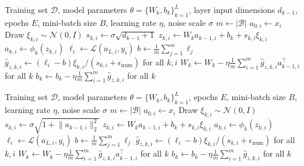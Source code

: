 \begin{algorithm}[htbp]
\caption{Fan-in scaled node perturbation}
\label{alg:fan_in_np_training}
\begin{algorithmic}[1]\algorithmicrowspacing
\Require Training set \(\mathcal{D}\), model parameters \(\theta=\{W_k,b_k\}_{k=1}^{L}\), layer input dimensions \(d_{k-1}\), epochs \(E\), mini-batch size \(B\), learning rate \(\eta\), noise scale \(\sigma\)
        \State \(m \gets |\mathcal{B}|\)
            \State \(a_{0,i}\gets x_i\)
                \State Draw \(\xi_{k,i}\sim\mathcal{N}(0,I)\)
                \State \(s_{k,i}\gets \sigma\sqrt{d_{k-1}+1}\) 
                \State \(z_{k,i}\gets W_k a_{k-1,i}+b_k+s_{k,i}\xi_{k,i}\)
                \State \(a_{k,i}\gets \phi_k(z_{k,i})\)
            \EndFor
            \State \(\ell_i\gets \mathcal{L}(a_{L,i},y_i)\)
        \EndFor
        \State \(b\gets \frac{1}{m}\sum_{j=1}^{m}\ell_j\)
        \State \(\widehat{g}_{z,k,i}\gets(\ell_i-b)\xi_{k,i}/(s_{k,i}+\epsilon_{\mathrm{num}})\) for all \(k,i\)
        \State \(W_k\gets W_k-\eta\frac{1}{m}\sum_{i=1}^{m}\widehat{g}_{z,k,i}a_{k-1,i}^{\top}\) for all \(k\)
        \State \(b_k\gets b_k-\eta\frac{1}{m}\sum_{i=1}^{m}\widehat{g}_{z,k,i}\) for all \(k\)
    \EndFor
\EndFor
\end{algorithmic}
\end{algorithm}
\vspace{2.5em}

\begin{algorithm}[htbp]
\caption{Input-scaled node perturbation (IS-NP)}
\label{alg:is_np_training}
\begin{algorithmic}[1]\algorithmicrowspacing
\Require Training set \(\mathcal{D}\), model parameters \(\theta=\{W_k,b_k\}_{k=1}^{L}\), epochs \(E\), mini-batch size \(B\), learning rate \(\eta\), noise scale \(\sigma\)
        \State \(m \gets |\mathcal{B}|\)
            \State \(a_{0,i}\gets x_i\)
                \State Draw \(\xi_{k,i}\sim\mathcal{N}(0,I)\)
                \State \(s_{k,i}\gets \sigma\sqrt{1+\lVert a_{k-1,i}\rVert_2^2}\) 
                \State \(z_{k,i}\gets W_k a_{k-1,i}+b_k+s_{k,i}\xi_{k,i}\)
                \State \(a_{k,i}\gets \phi_k(z_{k,i})\)
            \EndFor
            \State \(\ell_i\gets \mathcal{L}(a_{L,i},y_i)\)
        \EndFor
        \State \(b\gets \frac{1}{m}\sum_{j=1}^{m}\ell_j\)
        \State \(\widehat{g}_{z,k,i}\gets(\ell_i-b)\xi_{k,i}/(s_{k,i}+\epsilon_{\mathrm{num}})\) for all \(k,i\)
        \State \(W_k\gets W_k-\eta\frac{1}{m}\sum_{i=1}^{m}\widehat{g}_{z,k,i}a_{k-1,i}^{\top}\) for all \(k\)
        \State \(b_k\gets b_k-\eta\frac{1}{m}\sum_{i=1}^{m}\widehat{g}_{z,k,i}\) for all \(k\)
    \EndFor
\EndFor
\end{algorithmic}
\end{algorithm}
\FloatBarrier

